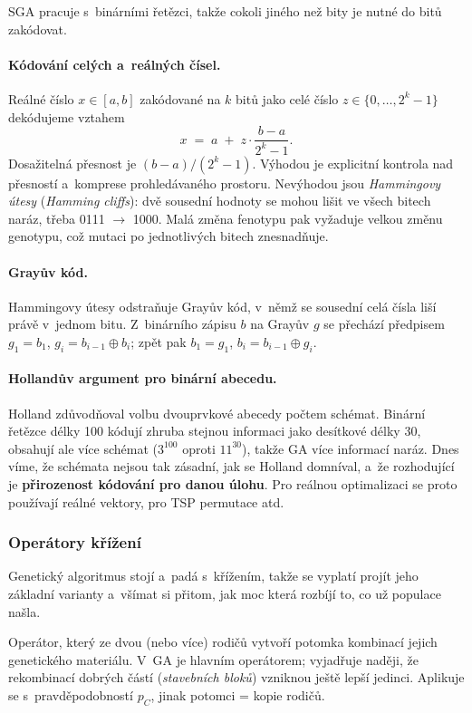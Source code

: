 \documentclass[11pt,a4paper]{article}
\theoremstyle{definition}
\begin{document}
SGA pracuje s~binárními řetězci, takže cokoli jiného než bity je nutné do bitů zakódovat.

\paragraph{Kódování celých a~reálných čísel.} Reálné číslo $x \in [a,b]$
zakódované na $k$ bitů jako celé číslo $z \in \{0,\dots,2^k-1\}$ dekódujeme vztahem
\[
x \;=\; a \;+\; z \cdot \frac{b-a}{2^k - 1}.
\]
Dosažitelná přesnost je $(b-a)/(2^k-1)$. Výhodou je explicitní kontrola nad přesností
a~komprese prohledávaného prostoru. Nevýhodou jsou \emph{Hammingovy útesy}
(\emph{Hamming cliffs}): dvě sousední hodnoty se mohou lišit ve všech bitech naráz,
třeba 0111 $\to$ 1000. Malá změna fenotypu pak vyžaduje velkou změnu genotypu, což
mutaci po jednotlivých bitech znesnadňuje.

\paragraph{Grayův kód.} Hammingovy útesy odstraňuje Grayův kód, v~němž se sousední celá
čísla liší právě v~jednom bitu. Z~binárního zápisu $b$ na Grayův $g$ se přechází předpisem
$g_1 = b_1$, $g_i = b_{i-1} \oplus b_i$; zpět pak $b_1 = g_1$,
$b_i = b_{i-1} \oplus g_i$.

\paragraph{Hollandův argument pro binární abecedu.} Holland zdůvodňoval volbu dvouprvkové
abecedy počtem schémat. Binární řetězce délky 100 kódují zhruba stejnou informaci jako
desítkové délky 30, obsahují ale více schémat ($3^{100}$ oproti $11^{30}$), takže GA
 více informací naráz. Dnes víme, že schémata nejsou tak zásadní, jak se
Holland domníval, a~že rozhodující je \textbf{přirozenost kódování pro danou úlohu}. Pro
reálnou optimalizaci se proto používají reálné vektory, pro TSP permutace atd.

\subsubsection{Operátory křížení}

Genetický algoritmus stojí a~padá s~křížením, takže se vyplatí projít jeho základní varianty
a~všímat si přitom, jak moc která rozbíjí to, co už populace našla.

\begin{defbox}
Operátor, který ze dvou (nebo více) rodičů vytvoří potomka kombinací jejich
genetického materiálu. V~GA je hlavním operátorem; vyjadřuje naději, že
rekombinací dobrých částí (\emph{stavebních bloků}) vzniknou ještě lepší
jedinci. Aplikuje se s~pravděpodobností $p_C$, jinak potomci = kopie rodičů.
\end{defbox}
\end{document}
